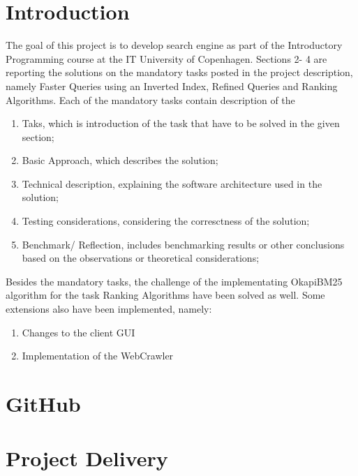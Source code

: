 \section{Introduction}
\label{sec:Introduction}
The goal of this project is to develop search engine as part of the Introductory Programming course at the IT University of Copenhagen. Sections 2- 4 are reporting the solutions on the mandatory tasks posted in the project description, namely Faster Queries using an Inverted Index, Refined Queries and Ranking Algorithms. Each of the mandatory tasks contain description of the\\ 

\begin{enumerate}
\item Taks, which is introduction of the task that have to be solved in the given section;
\item Basic Approach, which describes the solution;
\item Technical description, explaining the software architecture used in the solution;
\item Testing considerations, considering the corresctness of the solution;
\item  Benchmark/ Reflection, includes benchmarking results or other conclusions based on the observations or theoretical considerations;
\end{enumerate}

Besides the mandatory tasks, the challenge of the implementating OkapiBM25 algorithm for the task Ranking Algorithms have been solved as well. Some extensions also have been implemented, namely:
\begin{enumerate}
    \item Changes to the client GUI
    \item Implementation of the WebCrawler
\end{enumerate}

\section{GitHub}
\label{sec:GitHub}

\section{Project Delivery}
\label{sec:Project Delivery}

